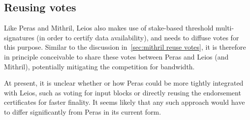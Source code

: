 \subsection{Reusing votes}
Like Peras and Mithril, Leios also makes use of stake-based threshold multi-signatures (in order to certify data availability), and needs to diffuse votes for this purpose.
Similar to the discussion in~\cref{sec:mithril reuse votes}, it is therefore in principle conceivable to share these votes between Peras and Leios (and Mithril), potentially mitigating the competition for bandwidth.

\medskip
At present, it is unclear whether or how Peras could be more tightly integrated with Leios, such as voting for input blocks or directly reusing the endorsement certificates for faster finality.
It seems likely that any such approach would have to differ significantly from Peras in its current form.


